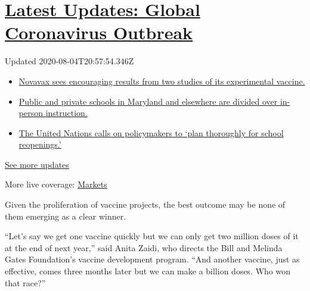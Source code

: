 \hypertarget{latest-updates-global-coronavirus-outbreak}{%
\section{\texorpdfstring{\href{https://www.nytimes.com/2020/08/04/world/coronavirus-cases.html?action=click\&pgtype=Article\&state=default\&region=MAIN_CONTENT_1\&context=storylines_live_updates}{Latest
Updates: Global Coronavirus
Outbreak}}{Latest Updates: Global Coronavirus Outbreak}}\label{latest-updates-global-coronavirus-outbreak}}

Updated 2020-08-04T20:57:54.346Z

\begin{itemize}
\tightlist
\item
  \href{https://www.nytimes.com/2020/08/04/world/coronavirus-cases.html?action=click\&pgtype=Article\&state=default\&region=MAIN_CONTENT_1\&context=storylines_live_updates\#link-1228a480}{Novavax
  sees encouraging results from two studies of its experimental
  vaccine.}
\item
  \href{https://www.nytimes.com/2020/08/04/world/coronavirus-cases.html?action=click\&pgtype=Article\&state=default\&region=MAIN_CONTENT_1\&context=storylines_live_updates\#link-4825b93}{Public
  and private schools in Maryland and elsewhere are divided over
  in-person instruction.}
\item
  \href{https://www.nytimes.com/2020/08/04/world/coronavirus-cases.html?action=click\&pgtype=Article\&state=default\&region=MAIN_CONTENT_1\&context=storylines_live_updates\#link-50f7386d}{The
  United Nations calls on policymakers to `plan thoroughly for school
  reopenings.'}
\end{itemize}

\href{https://www.nytimes.com/2020/08/04/world/coronavirus-cases.html?action=click\&pgtype=Article\&state=default\&region=MAIN_CONTENT_1\&context=storylines_live_updates}{See
more updates}

More live coverage:
\href{https://www.nytimes.com/live/2020/08/04/business/stock-market-today-coronavirus?action=click\&pgtype=Article\&state=default\&region=MAIN_CONTENT_1\&context=storylines_live_updates}{Markets}

Given the proliferation of vaccine projects, the best outcome may be
none of them emerging as a clear winner.

``Let's say we get one vaccine quickly but we can only get two million
doses of it at the end of next year,'' said Anita Zaidi, who directs the
Bill and Melinda Gates Foundation's vaccine development program. ``And
another vaccine, just as effective, comes three months later but we can
make a billion doses. Who won that race?''

